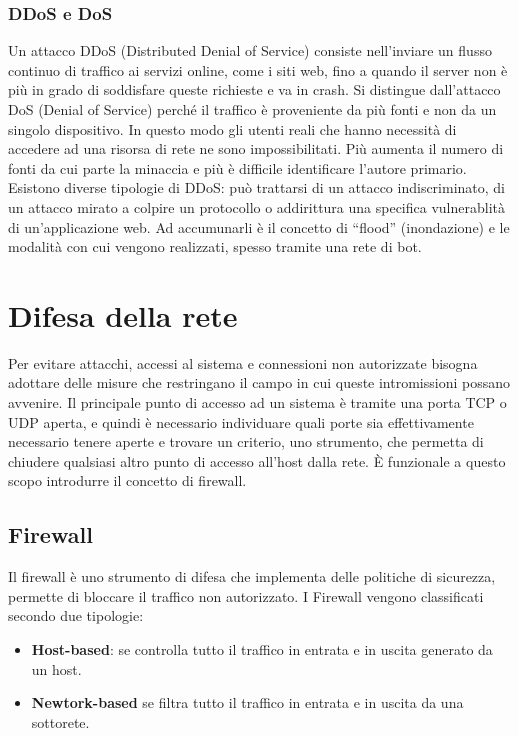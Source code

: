 \subsubsection{DDoS e DoS}

Un attacco DDoS (Distributed Denial of Service) consiste nell'inviare un flusso continuo di traffico ai servizi online, come i siti web, fino a quando il server non è più in grado di soddisfare queste richieste e va in crash. Si distingue dall'attacco DoS (Denial of Service) perché il traffico è proveniente da più fonti e non da un singolo dispositivo.
In questo modo gli utenti reali che hanno necessità di accedere ad una risorsa di rete ne sono impossibilitati. Più aumenta il numero di fonti da cui parte la minaccia e più è difficile identificare l'autore primario. Esistono diverse tipologie di DDoS: può trattarsi di un attacco indiscriminato, di un attacco mirato a colpire un protocollo o addirittura una specifica vulnerablità di un'applicazione web. Ad accumunarli è il concetto di  ``flood'' (inondazione) e le modalità con cui vengono realizzati, spesso tramite una rete di bot.


\section{Difesa della rete}

Per evitare attacchi, accessi al sistema e connessioni non autorizzate bisogna adottare delle misure che restringano il campo in cui queste intromissioni possano avvenire. Il principale punto di accesso ad un sistema è tramite una porta TCP o UDP aperta, e quindi è necessario individuare quali porte sia effettivamente necessario tenere aperte e trovare un criterio, uno strumento, che permetta di chiudere qualsiasi altro punto di accesso all'host dalla rete. È funzionale a questo scopo introdurre il concetto di firewall.

\subsection{Firewall}

Il firewall è uno strumento di difesa che implementa delle politiche di sicurezza, permette di bloccare il traffico non autorizzato. I Firewall vengono classificati secondo due tipologie:
\begin{itemize}
    \item \textbf{Host-based}: se controlla tutto il traffico in entrata e in uscita generato da un host.
    \item \textbf{Newtork-based} se filtra tutto il traffico in entrata e in uscita da una sottorete.
\end{itemize}

